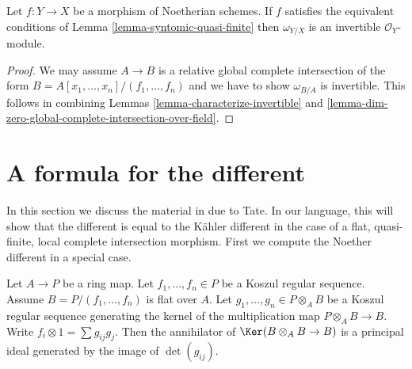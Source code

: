 \begin{lemma}
\label{lemma-dualizing-syntomic-quasi-finite}
Let $f : Y \to X$ be a morphism of Noetherian schemes. If $f$
satisfies the equivalent conditions of Lemma \ref{lemma-syntomic-quasi-finite}
then $\omega_{Y/X}$ is an invertible $\mathcal{O}_Y$-module.
\end{lemma}

\begin{proof}
We may assume $A \to B$ is a relative global complete
intersection of the form $B = A[x_1, \ldots, x_n]/(f_1, \ldots, f_n)$
and we have to show $\omega_{B/A}$ is invertible.
This follows in combining Lemmas \ref{lemma-characterize-invertible} and
\ref{lemma-dim-zero-global-complete-intersection-over-field}.
\end{proof}






\section{A formula for the different}
\label{section-formula-different}

\noindent
In this section we discuss the material in \cite[Appendix A]{Mazur-Roberts}
due to Tate. In our language, this will show that the different is
equal to the K\"ahler different in the case of a flat, quasi-finite,
local complete intersection morphism.
First we compute the Noether different in a special case.

\begin{lemma}
\label{lemma-tate}
\begin{reference}
\cite[Appendix]{Mazur-Roberts}
\end{reference}
Let $A \to P$ be a ring map. Let $f_1, \ldots, f_n \in P$ be a
Koszul regular sequence. Assume $B = P/(f_1, \ldots, f_n)$
is flat over $A$. Let $g_1, \ldots, g_n \in P \otimes_A B$
be a Koszul regular sequence generating the kernel of the multiplication
map $P \otimes_A B \to B$. Write $f_i \otimes 1 = \sum g_{ij} g_j$.
Then the annihilator of $\Ker(B \otimes_A B \to B)$ is a principal
ideal generated by the image of $\det(g_{ij})$.
\end{lemma}

